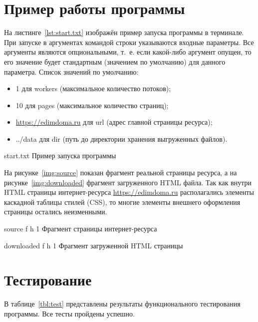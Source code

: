 \chapter{Пример работы программы}

На листинге~\ref{lst:start.txt} изображён пример запуска программы в терминале. При запуске в аргументах командой строки указываются входные параметры. Все аргументы являются опциональными, т.~е. если какой-либо аргумент опущен, то его значение будет стандартным (значением по умолчанию) для данного параметра. Список значений по умолчанию:

\begin{itemize}[label=--]
    \item 1 для workers (максимальное количество потоков);
    \item 10 для pages (максимальное количество страниц);
    \item \url{https://edimdoma.ru} для url (адрес главной страницы ресурса);
    \item ../data для dir (путь до директории хранения выгруженных файлов).
\end{itemize}

{start.txt}
{Пример запуска программы}

На рисунке~\ref{img:source} показан фрагмент реальной страницы ресурса, а на рисунке~\ref{img:downloaded} фрагмент загруженного HTML файла. Так как внутри HTML страницы интернет-ресурса \url{https://edimdoma.ru} располагались элементы каскадной таблицы стилей (CSS), то многие элементы внешнего оформления страницы остались неизменными.

{source}
{f}
{h}
{1 \textwidth}
{Фрагмент страницы интернет-ресурса}

{downloaded}
{f}
{h}
{1 \textwidth}
{Фрагмент загруженной HTML страницы}

\clearpage

\chapter{Тестирование}

В таблице~\ref{tbl:test} представлены результаты функционального тестирования программы. Все тесты пройдены успешно.

